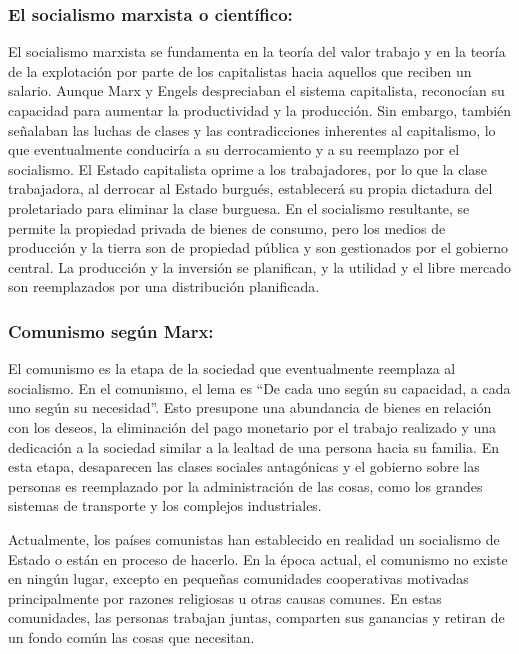 \documentclass[
  jou,
  floatsintext,
  longtable,
  a4paper,
  nolmodern,
  notxfonts,
  notimes,
  12pt,
  colorlinks=true,linkcolor=blue,citecolor=blue,urlcolor=blue]{apa7}
\begin{document}
\subsubsection{El socialismo marxista o
científico:}\label{el-socialismo-marxista-o-cientuxedfico}

El socialismo marxista se fundamenta en la teoría del valor trabajo y en
la teoría de la explotación por parte de los capitalistas hacia aquellos
que reciben un salario. Aunque Marx y Engels despreciaban el sistema
capitalista, reconocían su capacidad para aumentar la productividad y la
producción. Sin embargo, también señalaban las luchas de clases y las
contradicciones inherentes al capitalismo, lo que eventualmente
conduciría a su derrocamiento y a su reemplazo por el socialismo. El
Estado capitalista oprime a los trabajadores, por lo que la clase
trabajadora, al derrocar al Estado burgués, establecerá su propia
dictadura del proletariado para eliminar la clase burguesa. En el
socialismo resultante, se permite la propiedad privada de bienes de
consumo, pero los medios de producción y la tierra son de propiedad
pública y son gestionados por el gobierno central. La producción y la
inversión se planifican, y la utilidad y el libre mercado son
reemplazados por una distribución planificada.

\subsubsection{Comunismo según Marx:}\label{comunismo-seguxfan-marx}

El comunismo es la etapa de la sociedad que eventualmente reemplaza al
socialismo. En el comunismo, el lema es ``De cada uno según su
capacidad, a cada uno según su necesidad''. Esto presupone una
abundancia de bienes en relación con los deseos, la eliminación del pago
monetario por el trabajo realizado y una dedicación a la sociedad
similar a la lealtad de una persona hacia su familia. En esta etapa,
desaparecen las clases sociales antagónicas y el gobierno sobre las
personas es reemplazado por la administración de las cosas, como los
grandes sistemas de transporte y los complejos industriales.

Actualmente, los países comunistas han establecido en realidad un
socialismo de Estado o están en proceso de hacerlo. En la época actual,
el comunismo no existe en ningún lugar, excepto en pequeñas comunidades
cooperativas motivadas principalmente por razones religiosas u otras
causas comunes. En estas comunidades, las personas trabajan juntas,
comparten sus ganancias y retiran de un fondo común las cosas que
necesitan.
\end{document}
